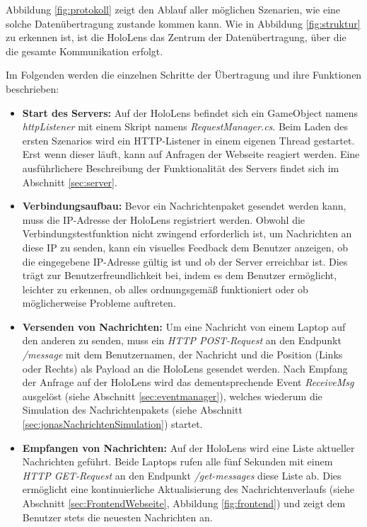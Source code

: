Abbildung \ref{fig:protokoll} zeigt den Ablauf aller möglichen Szenarien, wie eine solche Datenübertragung zustande kommen kann. Wie in Abbildung \ref{fig:struktur} zu erkennen ist, ist die HoloLens das Zentrum der Datenübertragung, über die die gesamte Kommunikation erfolgt.

Im Folgenden werden die einzelnen Schritte der Übertragung und ihre Funktionen beschrieben:

\begin{itemize}
\item \textbf{Start des Servers:} Auf der HoloLens befindet sich ein GameObject namens \textit{httpListener} mit einem Skript namens \textit{RequestManager.cs}. Beim Laden des ersten Szenarios wird ein HTTP-Listener in einem eigenen Thread gestartet. Erst wenn dieser läuft, kann auf Anfragen der Webseite reagiert werden. Eine ausführlichere Beschreibung der Funktionalität des Servers findet sich im Abschnitt \ref{sec:server}.
\item \textbf{Verbindungsaufbau:} Bevor ein Nachrichtenpaket gesendet werden kann, muss die IP-Adresse der HoloLens registriert werden. Obwohl die Verbindungstestfunktion nicht zwingend erforderlich ist, um Nachrichten an diese IP zu senden, kann ein visuelles Feedback dem Benutzer anzeigen, ob die eingegebene IP-Adresse gültig ist und ob der Server erreichbar ist. Dies trägt zur Benutzerfreundlichkeit bei, indem es dem Benutzer ermöglicht, leichter zu erkennen, ob alles ordnungsgemäß funktioniert oder ob möglicherweise Probleme auftreten.
\item \textbf{Versenden von Nachrichten:} Um eine Nachricht von einem Laptop auf den anderen zu senden, muss ein \textit{HTTP POST-Request} an den Endpunkt \textit{/message} mit dem Benutzernamen, der Nachricht und die Position (Links oder Rechts) als Payload an die HoloLens gesendet werden. Nach Empfang der Anfrage auf der HoloLens wird das dementsprechende Event \textit{ReceiveMsg} ausgelöst (siehe Abschnitt \ref{sec:eventmanager}), welches wiederum die Simulation des Nachrichtenpakets (siehe Abschnitt \ref{sec:jonasNachrichtenSimulation}) startet.
\item \textbf{Empfangen von Nachrichten:} Auf der HoloLens wird eine Liste aktueller Nachrichten geführt. Beide Laptops rufen alle fünf Sekunden mit einem \textit{HTTP GET-Request} an den Endpunkt \textit{/get-messages} diese Liste ab. Dies ermöglicht eine kontinuierliche Aktualisierung des Nachrichtenverlaufs (siehe Abschnitt \ref{sec:FrontendWebseite}, Abbildung \ref{fig:frontend}) und zeigt dem Benutzer stets die neuesten Nachrichten an.
\end{itemize}

